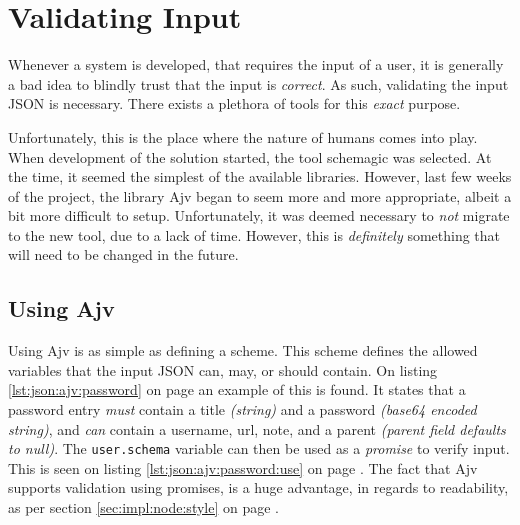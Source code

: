 %
	\section{Validating Input}
		Whenever a system is developed, that requires the input of a user, it is generally a bad idea to blindly trust that the input is \emph{correct}. As such, validating the input JSON is necessary. There exists a plethora of tools for this \emph{exact} purpose. 

		Unfortunately, this is the place where the nature of humans comes into play. When development of the solution started, the tool schemagic was selected. At the time, it seemed the simplest of the available libraries. However, last few weeks of the project, the library Ajv began to seem more and more appropriate, albeit a bit more difficult to setup. Unfortunately, it was deemed necessary to \emph{not} migrate to the new tool, due to a lack of time. However, this is \emph{definitely} something that will need to be changed in the future.

		\subsection{Using Ajv}
			Using Ajv is as simple as defining a scheme. This scheme defines the allowed variables that the input JSON can, may, or should contain. On listing \ref{lst:json:ajv:password} on page \pageref{lst:json:ajv:password} an example of this is found. It states that a password entry \emph{must} contain a title \emph{(string)} and a password \emph{(base64 encoded string)}, and \emph{can} contain a username, url, note, and a parent \emph{(parent field defaults to null)}. The \verb=user.schema= variable can then be used as a \emph{promise} to verify input. This is seen on listing \ref{lst:json:ajv:password:use} on page \pageref{lst:json:ajv:password}. The fact that Ajv supports validation using promises, is a huge advantage, in regards to readability, as per section \ref{sec:impl:node:style} on page \pageref{sec:impl:node:style}.

